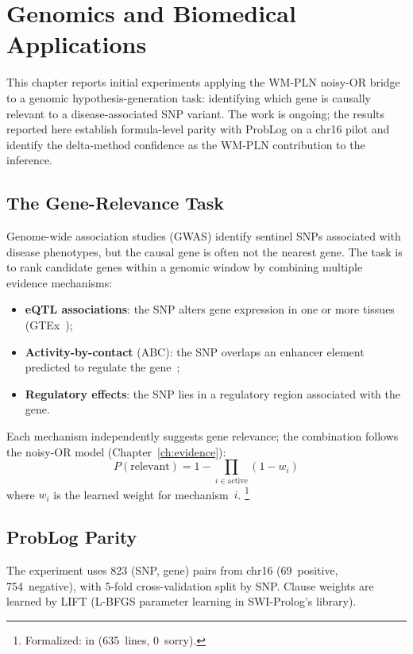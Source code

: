 \documentclass[11pt,openany]{report}
\begin{document}

\chapter{Genomics and Biomedical Applications}
\label{ch:bio}

This chapter reports initial experiments applying the WM-PLN
noisy-OR bridge to a genomic hypothesis-generation task: identifying
which gene is causally relevant to a disease-associated SNP variant.
The work is ongoing; the results reported here establish formula-level
parity with ProbLog on a chr16 pilot and identify the delta-method
confidence as the WM-PLN contribution to the inference.


\section{The Gene-Relevance Task}

Genome-wide association studies (GWAS) identify sentinel SNPs
associated with disease phenotypes, but the causal gene is often
not the nearest gene.  The task is to rank candidate genes within
a genomic window by combining multiple evidence mechanisms:
\begin{itemize}
\item \textbf{eQTL associations}: the SNP alters gene expression
  in one or more tissues (GTEx~\cite{GTEx2020});
\item \textbf{Activity-by-contact} (ABC): the SNP overlaps an
  enhancer element predicted to regulate the gene~\cite{Nasser2021ABC};
\item \textbf{Regulatory effects}: the SNP lies in a regulatory
  region associated with the gene.
\end{itemize}
Each mechanism independently suggests gene relevance; the
combination follows the noisy-OR model
(Chapter~\ref{ch:evidence}):
\[
  P(\text{relevant}) = 1 - \prod_{i \in \text{active}} (1 - w_i)
\]
where $w_i$ is the learned weight for mechanism~$i$.%
\footnote{Formalized:
 in
(635~lines, 0~sorry).}


\section{ProbLog Parity}

The experiment uses 823 (SNP, gene) pairs from chr16
(69~positive, 754~negative), with 5-fold cross-validation split
by SNP.  Clause weights are learned by LIFT (L-BFGS parameter
learning in SWI-Prolog's  library).
\end{document}
